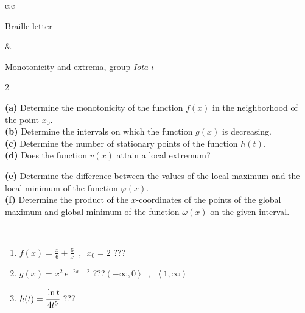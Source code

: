 \documentclass[10pt]{report}
\begin{document}
\begin{tabular}{c:c}
\begin{minipage}[c][104.5mm][t]{0.5\linewidth}
\begin{center}
\begin{minipage}{0.20\linewidth}
\begin{center}
{\small Braille letter}
\end{center}
\end{minipage}
\end{center}
\end{minipage}
&
\begin{minipage}[c][104.5mm][t]{0.5\linewidth}
\begin{center}
\vspace{5mm}
{\huge Monotonicity and extrema, group \textit{Iota $\iota$} -}\\[5mm]
\begin{minipage}{0.95\linewidth}
\begin{center}
{\small \begin{multicols}{2} \raggedright
\textbf{(a)} Determine the monotonicity of the function \(f(x)\) in the neighborhood of the point \(x_0\). \\[1mm]
\textbf{(b)} Determine the intervals on which the function \(g(x)\) is decreasing. \\[1mm]
\textbf{(c)} Determine the number of stationary points of the function \(h(t)\). \\[1mm]
\textbf{(d)} Does the function \(v(x)\) attain a local extremum? \par \columnbreak
\textbf{(e)} Determine the difference between the values of the local maximum and the local minimum of the function \(\varphi(x)\). \\[1mm]
\textbf{(f)} Determine the product of the \(x\)-coordinates of the points of the global maximum and global minimum of the function \(\omega(x)\) on the given interval. \\[1mm]
\end{multicols}
}
\end{center}
\end{minipage}
\\[1mm]
\begin{minipage}{0.79\linewidth}
\begin{center}
\begin{varwidth}{\linewidth}
\setlength{\itemsep}{0pt}
\begin{enumerate}
\normalsize
\item $f(x)=\frac{x}{6}+\frac{6}{x} \enspace , \enspace x_0=2$\quad \dotfill\; ???\;\dotfill \quad {}
\item $g(x)=x^2\, e^{-2x-2}$\quad \dotfill\; ???\;\dotfill \quad $\left(-\infty , 0\right\rangle\enspace , \enspace \left\langle1 , \infty\right)$
\item $h(t)=\cfrac{\ln t}{4t^5}$\quad \dotfill\; ???\;\dotfill {}

\end{enumerate}
\end{varwidth}
\end{center}
\end{minipage}
\end{center}
\end{minipage}
\end{tabular}
\end{document}
